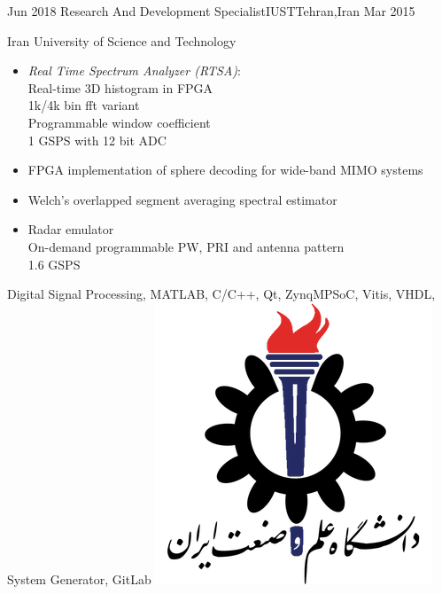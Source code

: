 \begin{experiences}
  \experience
  {Jun 2018} {Research And Development Specialist}{IUST}{Tehran,Iran}
  {Mar 2015} {
    Iran University of Science and Technology
    \begin{itemize}
      \item \emph{Real Time Spectrum Analyzer (RTSA)}:\\
            Real-time 3D histogram in FPGA\\
            1k/4k bin fft variant\\
            Programmable window coefficient\\
            1 GSPS with 12 bit ADC
      \item FPGA implementation of sphere decoding for wide-band MIMO systems
      \item Welch's overlapped segment averaging spectral estimator
      \item Radar emulator\\
            On-demand programmable PW, PRI and antenna pattern\\
            1.6 GSPS
    \end{itemize}
  }
  {Digital Signal Processing, MATLAB, C/C++, Qt, ZynqMPSoC, Vitis, VHDL, System Generator, GitLab}
  {\includegraphics[scale=0.12]{graphics/IUST_logo_color}}

  \emptySeparator


\end{experiences}
